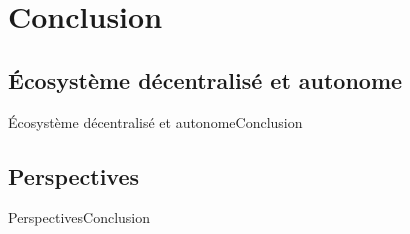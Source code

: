 \documentclass{beamer}
\begin{document}
\section{Conclusion}
\subsection{Écosystème décentralisé et autonome}
\begin{frame}{Écosystème décentralisé et autonome}{Conclusion}
\end{frame}

\subsection{Perspectives}
\begin{frame}{Perspectives}{Conclusion}
\end{frame}
\end{document}
